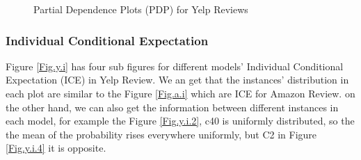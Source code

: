 \documentclass{article}
\begin{document}
\begin{figure}[H]
{\begin{minipage}[t]{0.48\textwidth}
\end{minipage}
}
\quad
{}
\caption{Partial Dependence Plots (PDP) for Yelp Reviews}
\label{Fig.y.p}
\end{figure}

\subsubsection{Individual Conditional Expectation}
Figure \ref{Fig.y.i} has four sub figures for different models' Individual Conditional Expectation (ICE) in Yelp Review. We an get that the instances' distribution in each plot are similar to the Figure \ref{Fig.a.i} which are ICE for Amazon Review. on the other hand, we can also get the information between different instances in each model, for example the Figure \ref{Fig.y.i.2}, c40 is uniformly distributed, so the  the mean of the probability rises everywhere uniformly, but C2 in Figure \ref{Fig.y.i.4} it is opposite.
\end{document}
